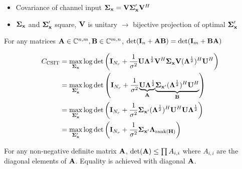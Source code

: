 \documentclass[xcolor=dvipsnames,aspectratio=169]{beamer}
\begin{document}
{\begin{itemize}
\begin{figure}
 \centering
{}
 \caption{AWGN MIMO DEC with linear tx. precoding}
\end{figure}
 \item Covariance of channel input $\mathbf{\boldsymbol{\Sigma}}_{\mathbf{x}}=\mathbf{V}\mathbf{\boldsymbol{\Sigma}}_{\mathbf{x}}'\mathbf{V}^H$
 \item $\mathbf{\boldsymbol{\Sigma}}_{\mathbf{x}}$ and $\mathbf{\boldsymbol{\Sigma}}_{\mathbf{x}}'$ square, $\mathbf{V}$ is unitary $\to$ bijective projection of optimal $\mathbf{\boldsymbol{\Sigma}}_{\mathbf{x}}'$
\end{itemize}
 \begin{theorem}
  For any matrices $\mathbf{A}\in\mathbb{C}^{n,m},\mathbf{B}\in\mathbb{C}^{m,n}$, $\det(\mathbf{I}_n+\mathbf{A}\mathbf{B})=\det(\mathbf{I}_m+\mathbf{B}\mathbf{A})$
 \end{theorem}
 \begin{equation*}
  \begin{split}
    C_{\textnormal{CSIT}}%
                         &= \max_{\Sg_\x}\log\det \left(\I_{N_{r}}+\frac{1}{\sigma^2}\U\Ld^{\frac{1}{2}}\V^H\Sg_\x\V(\Ld^{\frac{1}{2}})^H\U^H\right)\\
                         &= \max_{\Sg_\x'}\log\det \left(\I_{N_{r}}+\frac{1}{\sigma^2}\underset{\A}{\underbrace{\U\Ld^{\frac{1}{2}}}}\underset{\B}{\underbrace{\Sg_{\x'}(\Ld^{\frac{1}{2}})^H\U^H}}\right)\\
                         &= \max_{\Sg_\x'}\log\det \left(\I_{N_{r}}+\frac{1}{\sigma^2}\Sg_{\x'}(\Ld^{\frac{1}{2}})^H\U^H\U\Ld^{\frac{1}{2}}\right)\\
                         &= \max_{\Sg_\x'}\log\det \left(\I_{N_{r}}+\frac{1}{\sigma^2}\Sg_{\x'}\Ld_{\rank(\Hb)}\right)\\
  \end{split}
 \end{equation*}
 \pagebreak
 \begin{theorem}
  For any non-negative definite matrix $\mathbf{A}$, $\det(\mathbf{A})\leq \prod A_{i,i}$ where $A_{i,i}$ are the diagonal elements of $\mathbf{A}$. Equality is achieved with diagonal $\mathbf{A}$.

\end{theorem}}
\end{document}
